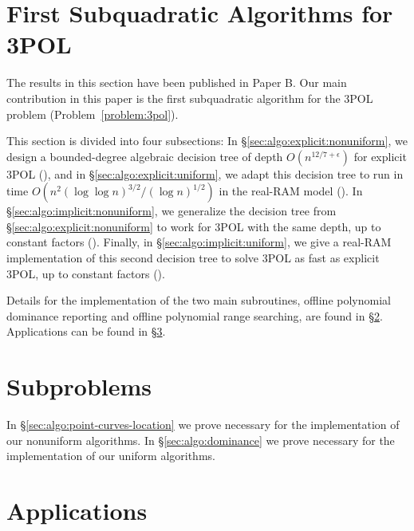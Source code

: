 \section{First Subquadratic Algorithms for 3POL}

The results in this section have been published in Paper B.
Our main contribution in this paper is the first subquadratic algorithm for
the 3POL problem (Problem~\ref{problem:3pol}).

This section is divided into four subsections:
%
In \S\ref{sec:algo:explicit:nonuniform},
we design a bounded-degree
algebraic decision tree
of depth $O(n^{12/7+\epsilon})$
for explicit 3POL (), and in
\S\ref{sec:algo:explicit:uniform}, we adapt this decision tree
to run in time $O(n^2 {(\log \log n)}^{3/2} / {(\log n)}^{1/2})$
in the real-RAM model ().
%
In \S\ref{sec:algo:implicit:nonuniform}, we generalize the decision tree from
\S\ref{sec:algo:explicit:nonuniform} to work for 3POL with the same depth, up
to constant factors ().
%
Finally, in \S\ref{sec:algo:implicit:uniform}, we give a real-RAM
implementation of this second decision tree to solve 3POL as fast as
explicit 3POL, up to constant factors ().

Details for the implementation of the two main subroutines,
offline polynomial dominance
reporting and offline polynomial range searching,
are found in
\S\ref{paper:3pol-algorithm:subproblems}.
Applications can be found in \S\ref{sec:applications}.






\section{Subproblems}\label{paper:3pol-algorithm:subproblems}

In \S\ref{sec:algo:point-curves-location} we prove  necessary for the
implementation of our nonuniform algorithms.
%
In \S\ref{sec:algo:dominance} we prove  necessary for the
implementation of our uniform algorithms.




\section{Applications}%
\label{sec:applications}




